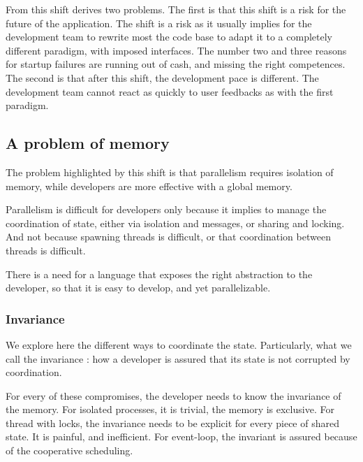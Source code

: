 From this shift derives two problems.
The first is that this shift is a risk for the future of the application.
The shift is a risk as it usually implies for the development team to rewrite most the code base to adapt it to a completely different paradigm, with imposed interfaces.
The number two and three reasons for startup failures are running out of cash, and missing the right competences.
The second is that after this shift, the development pace is different.
The development team cannot react as quickly to user feedbacks as with the first paradigm.



\subsection{A problem of memory}

The problem highlighted by this shift is that parallelism requires isolation of memory, while developers are more effective with a global memory.

Parallelism is difficult for developers only because it implies to manage the coordination of state, either via isolation and messages, or sharing and locking.
And not because spawning threads is difficult, or that coordination between threads is difficult.

There is a need for a language that exposes the right abstraction to the developer, so that it is easy to develop, and yet parallelizable.

\subsubsection{Invariance}

We explore here the different ways to coordinate the state.
Particularly, what we call the invariance : how a developer is assured that its state is not corrupted by coordination.

For every of these compromises, the developer needs to know the invariance of the memory.
For isolated processes, it is trivial, the memory is exclusive.
For thread with locks, the invariance needs to be explicit for every piece of shared state. It is painful, and inefficient.
For event-loop, the invariant is assured because of the cooperative scheduling.

